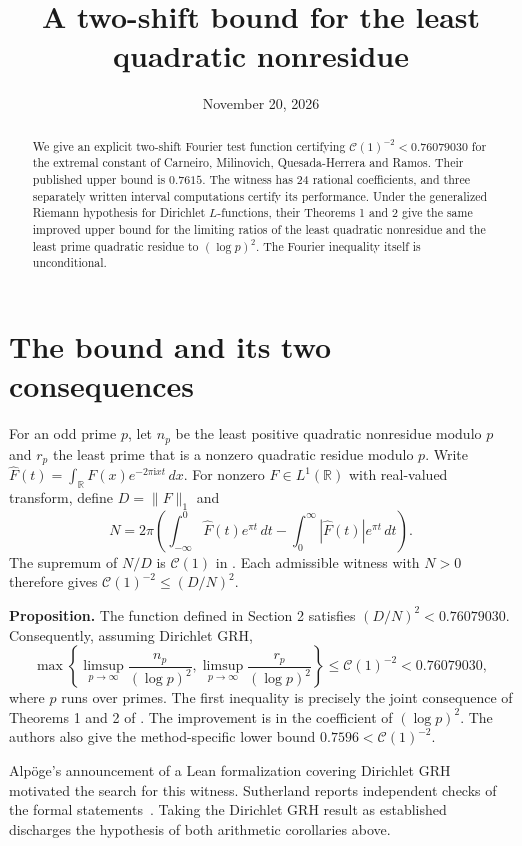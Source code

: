 \documentclass[11pt]{article}
\title{A two-shift bound for the least quadratic nonresidue}
\author{\paperAuthor}
\date{November 20, 2026}
\newcommand{\CC}{\mathcal C(1)}
\newcommand{\RR}{\mathbb R}
\newcommand{\ii}{\mathrm i}
\begin{document}
\maketitle
\begin{abstract}
We give an explicit two-shift Fourier test function certifying
$\mathcal C(1)^{-2}<0.76079030$ for the extremal constant of Carneiro,
Milinovich, Quesada-Herrera and Ramos. Their published upper bound is
$0.7615$. The witness has 24 rational coefficients, and three separately written interval
computations certify its performance. Under the generalized Riemann
hypothesis for Dirichlet $L$-functions, their Theorems 1 and 2 give the
same improved upper bound for the limiting ratios of the least quadratic
nonresidue and the least prime quadratic residue to $(\log p)^2$.
The Fourier inequality itself is unconditional.
\end{abstract}

\section{The bound and its two consequences}
For an odd prime $p$, let $n_p$ be the least positive quadratic nonresidue
modulo $p$ and $r_p$ the least prime that is a nonzero quadratic residue
modulo $p$. Write $\widehat F(t)=\int_{\RR} F(x)e^{-2\pi\ii xt}\,dx$. For
nonzero $F\in L^1(\RR)$ with real-valued transform, define $D=\|F\|_1$ and
\[
 N=2\pi\left(\int_{-\infty}^0 \widehat F(t)e^{\pi t}\,dt
                 -\int_0^\infty |\widehat F(t)|e^{\pi t}\,dt\right).
\]
The supremum of $N/D$ is $\CC$ in \cite[(1.1)]{cmqr}. Each admissible
witness with $N>0$ therefore gives $\CC^{-2}\le(D/N)^2$.

\medskip\noindent
\textbf{Proposition.} The function defined in Section 2 satisfies
$(D/N)^2<0.76079030$. Consequently, assuming Dirichlet GRH,
\[
 \max\!\left\{\limsup_{p\to\infty}\frac{n_p}{(\log p)^2},
               \limsup_{p\to\infty}\frac{r_p}{(\log p)^2}\right\}
 \le \CC^{-2}<0.76079030 ,
\]
where $p$ runs over primes. The first inequality is precisely the joint
consequence of Theorems 1 and 2 of \cite{cmqr}. The improvement is in the
coefficient of $(\log p)^2$. The authors also give the method-specific
lower bound $0.7596<\CC^{-2}$.

Alp\"oge's announcement of a Lean formalization covering Dirichlet
GRH~\cite{alpoge} motivated the search for this witness. Sutherland reports
independent checks of the formal statements~\cite{sutherland}. Taking the
Dirichlet GRH result as established discharges the hypothesis of both
arithmetic corollaries above.
\end{document}
